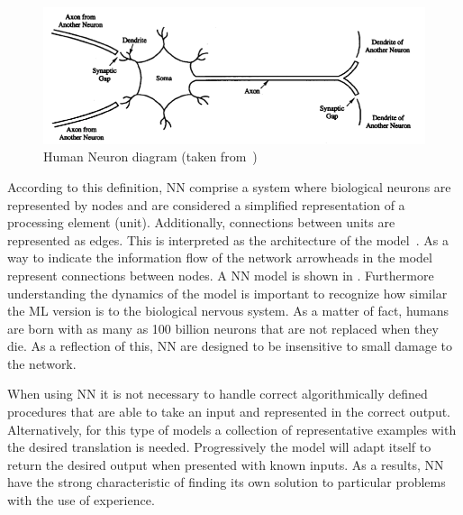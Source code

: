 \begin{figure}[htbp]
  \centering
  \includegraphics[width=\textwidth]{images/neuron}
  \caption{ Human Neuron diagram (taken from~\cite{fausett93}) }
  \label{fig:humanNeuron}
\end{figure}

According to this definition,  \ac{NN} comprise a system where biological neurons are represented by 
nodes and are considered a simplified representation of a processing element (unit). Additionally, 
connections between units are represented as edges. This is interpreted as the architecture of the 
model~\cite{fausett93}. As a way to indicate the information flow of the network arrowheads in the 
model represent connections between nodes. A \ac{NN} model is shown in . 
Furthermore understanding the dynamics of the model 
is important to recognize how similar the \ac{ML} version is to the biological nervous system. As a 
matter of fact, humans are born with as many as 100 billion neurons that are not replaced when they 
die. As a reflection of this, \ac{NN} are designed to be insensitive to small damage to the network. 

When using \ac{NN} it is not necessary to handle correct algorithmically defined procedures that are 
able to take an input and represented in the correct output. Alternatively, for this type of models a 
collection of representative examples with the desired translation is needed. Progressively the model 
will adapt itself to return the desired output when presented with known inputs. As a results, \ac{NN}  
have the strong characteristic of finding its  own solution to particular problems with the use of 
experience. 

